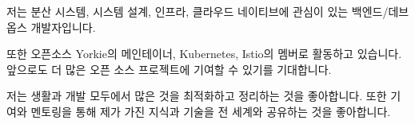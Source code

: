 

\begin{cvparagraph}

저는 분산 시스템, 시스템 설계, 인프라, 클라우드 네이티브에 관심이 있는 백엔드/데브옵스 개발자입니다.

또한 오픈소스 Yorkie의 메인테이너, Kubernetes, Istio의 멤버로 활동하고 있습니다. 앞으로도 더 많은 오픈 소스 프로젝트에 기여할 수 있기를 기대합니다.

저는 생활과 개발 모두에서 많은 것을 최적화하고 정리하는 것을 좋아합니다. 또한 기여와 멘토링을 통해 제가 가진 지식과 기술을 전 세계와 공유하는 것을 좋아합니다.
\end{cvparagraph}
